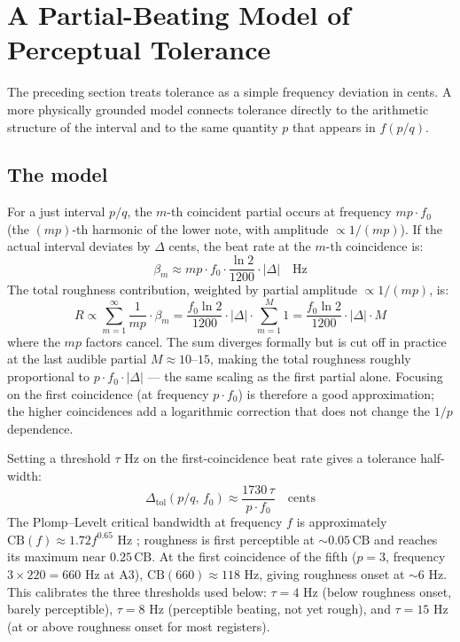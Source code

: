 \documentclass[11pt,a4paper]{article}
\begin{document}

\section{A Partial-Beating Model of Perceptual Tolerance}

The preceding section treats tolerance as a simple frequency deviation in
cents. A more physically grounded model connects tolerance directly to the
arithmetic structure of the interval and to the same quantity $p$ that appears
in $f(p/q)$.

\subsection*{The model}

For a just interval $p/q$, the $m$-th coincident partial occurs at frequency
$mp \cdot f_0$ (the $(mp)$-th harmonic of the lower note, with amplitude
$\propto 1/(mp)$). If the actual interval deviates by $\Delta$ cents, the
beat rate at the $m$-th coincidence is:
\[
  \beta_m \approx mp \cdot f_0 \cdot \frac{\ln 2}{1200} \cdot |\Delta|
  \quad \text{Hz}
\]
The total roughness contribution, weighted by partial amplitude $\propto
1/(mp)$, is:
\[
  R \propto \sum_{m=1}^{\infty} \frac{1}{mp} \cdot \beta_m
  = \frac{f_0 \ln 2}{1200} \cdot |\Delta| \cdot \sum_{m=1}^{M} 1
  = \frac{f_0 \ln 2}{1200} \cdot |\Delta| \cdot M
\]
where the $mp$ factors cancel. The sum diverges formally but is cut off in
practice at the last audible partial $M \approx 10$--$15$, making the total
roughness roughly proportional to $p \cdot f_0 \cdot |\Delta|$ --- the same
scaling as the first partial alone. Focusing on the first coincidence
(at frequency $p \cdot f_0$) is therefore a good approximation; the higher
coincidences add a logarithmic correction that does not change the $1/p$
dependence.

Setting a threshold $\tau$ Hz on the first-coincidence beat rate gives a
tolerance half-width:
\[
  \boxed{\Delta_{\mathrm{tol}}(p/q,\, f_0) \approx \frac{1730\,\tau}{p \cdot f_0}
  \quad \text{cents}}
\]
The Plomp--Levelt critical bandwidth at frequency $f$ is approximately
$\mathrm{CB}(f) \approx 1.72 f^{0.65}$ Hz \cite{plomplevelt1965}; roughness
is first perceptible at ${\sim}0.05\,\mathrm{CB}$ and reaches its maximum
near $0.25\,\mathrm{CB}$. At the first coincidence of the fifth ($p=3$,
frequency $3 \times 220 = 660$ Hz at A3), $\mathrm{CB}(660) \approx 118$ Hz,
giving roughness onset at ${\sim}6$ Hz. This calibrates the three thresholds
used below: $\tau = 4$ Hz (below roughness onset, barely perceptible),
$\tau = 8$ Hz (perceptible beating, not yet rough), and $\tau = 15$ Hz
(at or above roughness onset for most registers).
\end{document}
